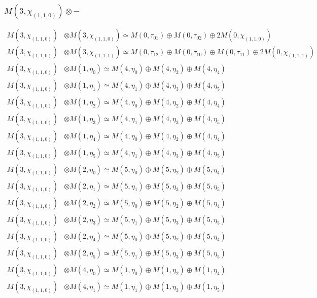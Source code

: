 \subsubsection{$ M(3,\chi_{(1,1,0)})\otimes -$}
\begin{align*}
M(3,\chi_{(1,1,0)}) &\otimes M(3,\chi_{(1,1,0)}) \simeq M(0,\tau_{01}) \oplus M(0,\tau_{02}) \oplus 2 M(0,\chi_{(1,1,0)}) \\
M(3,\chi_{(1,1,0)}) &\otimes M(3,\chi_{(1,1,1)}) \simeq M(0,\tau_{12}) \oplus M(0,\tau_{10}) \oplus M(0,\tau_{11}) \oplus 2 M(0,\chi_{(1,1,1)}) \\
M(3,\chi_{(1,1,0)}) &\otimes M(1,\eta_{0}) \simeq M(4,\eta_{0}) \oplus M(4,\eta_{2}) \oplus M(4,\eta_{4}) \\
M(3,\chi_{(1,1,0)}) &\otimes M(1,\eta_{1}) \simeq M(4,\eta_{1}) \oplus M(4,\eta_{3}) \oplus M(4,\eta_{5}) \\
M(3,\chi_{(1,1,0)}) &\otimes M(1,\eta_{2}) \simeq M(4,\eta_{0}) \oplus M(4,\eta_{2}) \oplus M(4,\eta_{4}) \\
M(3,\chi_{(1,1,0)}) &\otimes M(1,\eta_{3}) \simeq M(4,\eta_{1}) \oplus M(4,\eta_{3}) \oplus M(4,\eta_{5}) \\
M(3,\chi_{(1,1,0)}) &\otimes M(1,\eta_{4}) \simeq M(4,\eta_{0}) \oplus M(4,\eta_{2}) \oplus M(4,\eta_{4}) \\
M(3,\chi_{(1,1,0)}) &\otimes M(1,\eta_{5}) \simeq M(4,\eta_{1}) \oplus M(4,\eta_{3}) \oplus M(4,\eta_{5}) \\
M(3,\chi_{(1,1,0)}) &\otimes M(2,\eta_{0}) \simeq M(5,\eta_{0}) \oplus M(5,\eta_{2}) \oplus M(5,\eta_{4}) \\
M(3,\chi_{(1,1,0)}) &\otimes M(2,\eta_{1}) \simeq M(5,\eta_{1}) \oplus M(5,\eta_{3}) \oplus M(5,\eta_{5}) \\
M(3,\chi_{(1,1,0)}) &\otimes M(2,\eta_{2}) \simeq M(5,\eta_{0}) \oplus M(5,\eta_{2}) \oplus M(5,\eta_{4}) \\
M(3,\chi_{(1,1,0)}) &\otimes M(2,\eta_{3}) \simeq M(5,\eta_{1}) \oplus M(5,\eta_{3}) \oplus M(5,\eta_{5}) \\
M(3,\chi_{(1,1,0)}) &\otimes M(2,\eta_{4}) \simeq M(5,\eta_{0}) \oplus M(5,\eta_{2}) \oplus M(5,\eta_{4}) \\
M(3,\chi_{(1,1,0)}) &\otimes M(2,\eta_{5}) \simeq M(5,\eta_{1}) \oplus M(5,\eta_{3}) \oplus M(5,\eta_{5}) \\
M(3,\chi_{(1,1,0)}) &\otimes M(4,\eta_{0}) \simeq M(1,\eta_{0}) \oplus M(1,\eta_{2}) \oplus M(1,\eta_{4}) \\
M(3,\chi_{(1,1,0)}) &\otimes M(4,\eta_{1}) \simeq M(1,\eta_{1}) \oplus M(1,\eta_{3}) \oplus M(1,\eta_{5}) \\

\end{align*}
